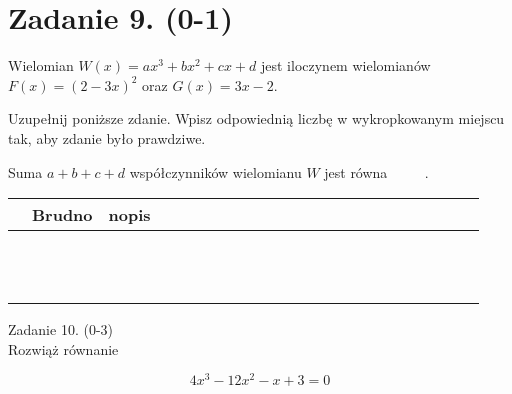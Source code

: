 \documentclass[10pt]{article}
\begin{document}
\section*{Zadanie 9. (0-1)}
Wielomian \(W(x)=a x^{3}+b x^{2}+c x+d\) jest iloczynem wielomianów \(F(x)=(2-3 x)^{2}\) oraz \(G(x)=3 x-2\).

Uzupełnij poniższe zdanie. Wpisz odpowiednią liczbę w wykropkowanym miejscu tak, aby zdanie było prawdziwe.

Suma \(a+b+c+d\) współczynników wielomianu \(W\) jest równa \(\qquad\) .

\begin{center}
\begin{tabular}{|c|c|c|c|c|c|c|c|c|c|c|c|c|c|c|c|c|c|c|c|c|c|c|}
\hline
 & Brudno & nopis &  &  &  &  &  &  &  &  &  &  &  &  &  &  &  &  &  &  &  &  \\
\hline
 &  &  &  &  &  &  &  &  &  &  &  &  &  &  &  &  &  &  &  &  &  &  \\
\hline
 &  &  &  &  &  &  &  &  &  &  &  &  &  &  &  &  &  &  &  &  &  &  \\
\hline
 &  &  &  &  &  &  &  &  &  &  &  &  &  &  &  &  &  &  &  &  &  &  \\
\hline
 &  &  &  &  &  &  &  &  &  &  &  &  &  &  &  &  &  &  &  &  &  &  \\
\hline
 &  &  &  &  &  &  &  &  &  &  &  &  &  &  &  &  &  &  &  &  &  &  \\
\hline
 &  &  &  &  &  &  &  &  &  &  &  &  &  &  &  &  &  &  &  &  &  &  \\
\hline
 &  &  &  &  &  &  &  &  &  &  &  &  &  &  &  &  &  &  &  &  &  &  \\
\hline
 &  &  &  &  &  &  &  &  &  &  &  &  &  &  &  &  &  &  &  &  &  &  \\
\hline
 &  &  &  &  &  &  &  &  &  &  &  &  &  &  &  &  &  &  &  &  &  &  \\
\hline
 &  &  &  &  &  &  &  &  &  &  &  &  &  &  &  &  &  &  &  &  &  &  \\
\hline
 &  &  &  &  &  &  &  &  &  &  &  &  &  &  &  &  &  &  &  &  &  &  \\
\hline
 &  &  &  &  &  &  &  &  &  &  &  &  &  &  &  &  &  &  &  &  &  &  \\
\hline
\end{tabular}
\end{center}

Zadanie 10. (0-3)\\
Rozwiąż równanie

\[
4 x^{3}-12 x^{2}-x+3=0
\]
\end{document}
